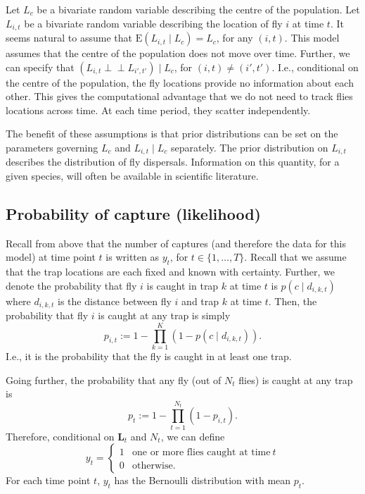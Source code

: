 \documentclass[
  oneside]{book}
\begin{document}
Let \(L_c\) be a bivariate random variable describing the centre of the population. Let \(L_{i, t}\) be a bivariate random variable describing the location of fly \(i\) at time \(t\). It seems natural to assume that \(\mathrm E (L_{i, t} \mid L_c) = L_c\), for any \((i, t)\). This model assumes that the centre of the population does not move over time. Further, we can specify that \((L_{i, t} \perp \!\!\! \perp L_{i', t'}) \mid L_c\), for \((i, t) \neq (i', t')\). I.e., conditional on the centre of the population, the fly locations provide no information about each other. This gives the computational advantage that we do not need to track flies locations across time. At each time period, they scatter independently.

The benefit of these assumptions is that prior distributions can be set on the parameters governing \(L_c\) and \(L_{i, t} \mid L_c\) separately. The prior distribution on \(L_{i, t}\) describes the distribution of fly dispersals. Information on this quantity, for a given species, will often be available in scientific literature.

\hypertarget{probability-of-capture-likelihood}{%
\subsection{Probability of capture (likelihood)}\label{probability-of-capture-likelihood}}

Recall from above that the number of captures (and therefore the data for this model) at time point \(t\) is written as \(y_t\), for \(t \in \{1, \ldots, T\}\). Recall that we assume that the trap locations are each fixed and known with certainty. Further, we denote the probability that fly \(i\) is caught in trap \(k\) at time \(t\) is \(p(c \mid d_{i, k, t})\) where \(d_{i,k,t}\) is the distance between fly \(i\) and trap \(k\) at time \(t\). Then, the probability that fly \(i\) is caught at any trap is simply
\[
p_{i, t} := 1 - \prod_{k=1}^K(1 - p(c \mid d_{i, k, t})).
\]
I.e., it is the probability that the fly is caught in at least one trap.

Going further, the probability that any fly (out of \(N_t\) flies) is caught at any trap is
\[
p_t := 1 - \prod_{t=1}^{N_t} (1 - p_{i,t}).
\]
Therefore, conditional on \(\mathbf L_t\) and \(N_t\), we can define
\[
y_t = \begin{cases} 1 & \text{one or more flies caught at time} ~t \\ 0 & \text{otherwise.} \end{cases}
\]
For each time point \(t\), \(y_t\) has the Bernoulli distribution with mean \(p_t\).
\end{document}

